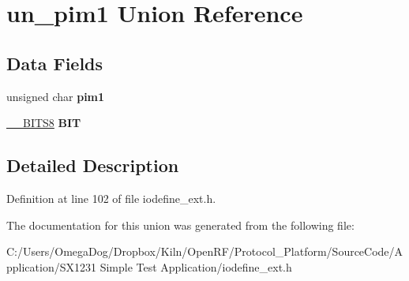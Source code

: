 \hypertarget{unionun__pim1}{\section{un\-\_\-pim1 Union Reference}
\label{unionun__pim1}
}
\subsection*{Data Fields}
\begin{DoxyCompactItemize}
\item 
\hypertarget{unionun__pim1_a022d5d973016185c947ed25c6c26e6a0}{unsigned char {\bfseries pim1}}\label{unionun__pim1_a022d5d973016185c947ed25c6c26e6a0}

\item 
\hypertarget{unionun__pim1_a064f6c2ff71c8122cf3b5fe40b88b145}{\hyperlink{struct_____b_i_t_s8}{\-\_\-\-\_\-\-B\-I\-T\-S8} {\bfseries B\-I\-T}}\label{unionun__pim1_a064f6c2ff71c8122cf3b5fe40b88b145}

\end{DoxyCompactItemize}


\subsection{Detailed Description}


Definition at line 102 of file iodefine\-\_\-ext.\-h.



The documentation for this union was generated from the following file\-:\begin{DoxyCompactItemize}
\item 
C\-:/\-Users/\-Omega\-Dog/\-Dropbox/\-Kiln/\-Open\-R\-F/\-Protocol\-\_\-\-Platform/\-Source\-Code/\-Application/\-S\-X1231 Simple Test Application/iodefine\-\_\-ext.\-h\end{DoxyCompactItemize}
